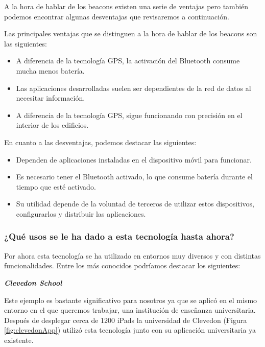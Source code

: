 A la hora de hablar de los beacons existen una serie de ventajas pero también podemos encontrar algunas desventajas que revisaremos a continuación. 

Las principales ventajas que se distinguen a la hora de hablar de los beacons son las siguientes: 

\begin{itemize}
\item A diferencia de la tecnología GPS, la activación del Bluetooth consume mucha menos batería. 
\item Las aplicaciones desarrolladas suelen ser dependientes de la red de datos al necesitar información. 
\item A diferencia de la tecnología GPS, sigue funcionando con precisión en el interior de los edificios.
\end{itemize} 

En cuanto a las desventajas, podemos destacar las siguientes:

\begin{itemize}
\item Dependen de aplicaciones instaladas en el dispositivo móvil para funcionar. 
\item Es necesario tener el Bluetooth activado, lo que consume batería durante el tiempo que esté activado. 
\item Su utilidad depende de la voluntad de terceros de utilizar estos dispositivos, configurarlos y distribuir las aplicaciones.
\end{itemize}

\subsubsection{¿Qué usos se le ha dado a esta tecnología hasta ahora?}

Por ahora esta tecnología se ha utilizado en entornos muy diversos y con distintas funcionalidades. Entre los más conocidos podríamos destacar los siguientes: 

\vspace{5mm}

\textsl{\textbf{{Clevedon School}}}

\vspace{2mm}

Este ejemplo es bastante significativo para nosotros ya que se aplicó en el mismo entorno en el que queremos trabajar, una institución de enseñanza universitaria. Después de desplegar cerca de 1200 iPads  la universidad de Clevedon (Figura \ref{fig:clevedonApp}) utilizó esta tecnología junto con su aplicación universitaria ya existente. 

